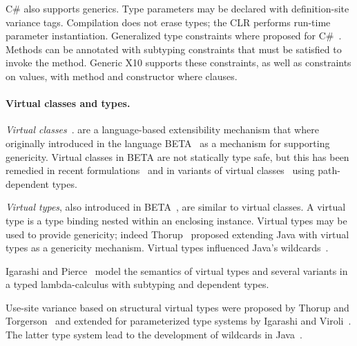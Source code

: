 C\# also supports generics.  Type parameters may be declared
with definition-site variance tags.  Compilation does not erase
types; the CLR performs run-time parameter instantiation.
Generalized type constraints where proposed for
C\#~\cite{emir06}.  Methods can be annotated with subtyping
constraints that must be satisfied to invoke the method.
Generic X10 supports these constraints, as well as constraints
on values, with method and constructor where clauses.

\paragraph{Virtual classes and types.}

{\em Virtual classes}~\cite{beta,mp89-virtual-classes,ernst06-virtual}.
are a language-based extensibility
mechanism that where
originally introduced in the language
BETA~\cite{beta} as a mechanism
for supporting genericity.
Virtual classes in BETA are not statically type safe, but this has been
remedied in recent formulations~\cite{ernst99-gbeta,ernst06-virtual} and in
variants of 
virtual classes~\cite{scala,nqm06,cdnw06-tribe,variant-path-types}
using path-dependent types.  

{\em Virtual types}, also introduced in BETA~\cite{beta},
are similar to virtual
classes.  A virtual type is a type binding nested within an
enclosing instance.
Virtual types
may be used to provide genericity; indeed
Thorup~\cite{thorup97} proposed extending Java with virtual types
as a genericity mechanism.  Virtual types influenced Java's 
wildcards~\cite{adding-wildcards,Java3,wildcards-safe}.

Igarashi and Pierce~\cite{ip99-virtual-types}
model the semantics of virtual types
and several variants
in a typed lambda-calculus with subtyping and dependent types.

Use-site variance based on 
structural virtual types
were proposed by Thorup and Torgerson~\cite{unifying-genericity}
and extended for parameterized type systems by Igarashi and
Viroli~\cite{variant-parametric-types}.  The latter type
system lead to the development of wildcards in
Java~\cite{Java3,adding-wildcards,wildcards-safe}.
